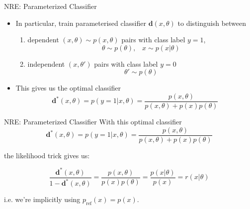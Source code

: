 \documentclass[12pt, aspectratio=169]{beamer}
\let\olditem\item
\renewcommand\item{\olditem\justifying}
\begin{document}
\begin{frame}{NRE: Parameterized Classifier}

    \begin{itemize}
        \item In particular, train parameterised classifier $\mathbf{d}(x, \theta)$ to distinguish between 
        \begin{enumerate}
            \item dependent $(x,\theta) \sim p(x, \theta)$ pairs with class label $y=1$, 
                $$\theta \sim p(\theta), \;\;\; x \sim p(x|\theta)$$
            \item independent $(x, \theta')$ pairs with class label $y=0$
                $$\theta' \sim p(\theta)$$
        \end{enumerate}
    
        \pause 
        
        \item This gives us the optimal classifier 
        $$\mathbf{d}^*(x, \theta) = p(y=1 | x, \theta) = \frac{p(x,\theta)}{p(x,\theta) + p(x)p(\theta)}$$

    \end{itemize}
\end{frame}

\begin{frame}{NRE: Parameterized Classifier} 
    With this optimal classifier
    $$\mathbf{d}^*(x, \theta) = p(y=1 | x, \theta) = \frac{p(x,\theta)}{p(x,\theta) + p(x)p(\theta)}$$

    \pause 
    
    the likelihood trick gives us:

    $$\frac{\mathbf{d}^*(x, \theta)}{1-\mathbf{d}^*(x, \theta)} = \frac{p(x,\theta)}{p(x)p(\theta)} = \frac{p(x|\theta)}{p(x)} = r(x|\theta)$$

    i.e. we're implicitly using $p_\text{ref}(x) = p(x)$.
\end{frame}
\end{document}
